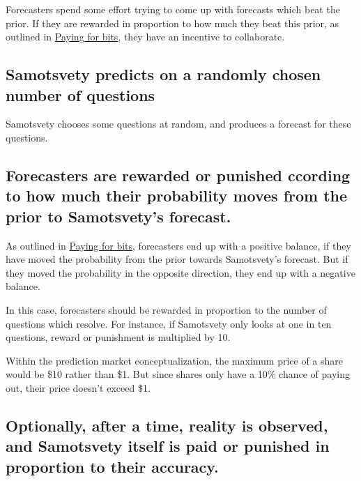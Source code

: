 \documentclass[]{article}
\begin{document}
Forecasters spend some effort trying to come up with forecasts which
beat the prior. If they are rewarded in proportion to how much they beat
this prior, as outlined in \href{}{Paying for bits}, they have an
incentive to collaborate.

\hypertarget{samotsvety-predicts-on-a-randomly-chosen-number-of-questions}{%
\subsection{Samotsvety predicts on a randomly chosen number of
questions}\label{samotsvety-predicts-on-a-randomly-chosen-number-of-questions}}

Samotsvety chooses some questions at random, and produces a forecast for
these questions.

\hypertarget{forecasters-are-rewarded-or-punished-ccording-to-how-much-their-probability-moves-from-the-prior-to-samotsvetys-forecast.}{%
\subsection{Forecasters are rewarded or punished ccording to how much
their probability moves from the prior to Samotsvety's
forecast.}\label{forecasters-are-rewarded-or-punished-ccording-to-how-much-their-probability-moves-from-the-prior-to-samotsvetys-forecast.}}

As outlined in \href{}{Paying for bits}, forecasters end up with a
positive balance, if they have moved the probability from the prior
towards Samotsvety's forecast. But if they moved the probability in the
opposite direction, they end up with a negative balance.

In this case, forecasters should be rewarded in proportion to the number
of questions which resolve. For instance, if Samotsvety only looks at
one in ten questions, reward or punishment is multiplied by 10.

Within the prediction market conceptualization, the maximum price of a
share would be \$10 rather than \$1. But since shares only have a 10\%
chance of paying out, their price doesn't exceed \$1.

\hypertarget{optionally-after-a-time-reality-is-observed-and-samotsvety-itself-is-paid-or-punished-in-proportion-to-their-accuracy.}{%
\subsection{Optionally, after a time, reality is observed, and
Samotsvety itself is paid or punished in proportion to their
accuracy.}\label{optionally-after-a-time-reality-is-observed-and-samotsvety-itself-is-paid-or-punished-in-proportion-to-their-accuracy.}}
\end{document}
